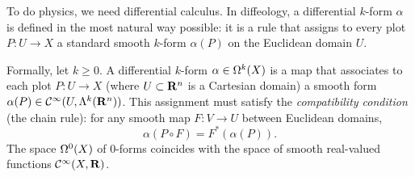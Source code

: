   \begin{article}
    To do physics,
    we need differential calculus.
    In diffeology,
    a differential $k$-form $\alpha$ is defined in the most natural way possible:
    it is a rule that assigns to every plot $P: U \to X$ a standard smooth $k$-form $\alpha(P)$ on the Euclidean domain $U$.
    
    Formally,
    let $k \geq 0$.
    A differential $k$-form $\alpha \in \Omega^k(X)$ is a map that associates to each plot $P: U \to X$ (where $U \subset {\mathbf{R}}^n$ is a Cartesian domain) a smooth form $\alpha(P) \in {\mathcal{C}}^\infty(U, \Lambda^k({\mathbf{R}}^n))$.
    This assignment must satisfy the \emph{compatibility condition} (the chain rule):
    for any smooth map $F: V \to U$ between Euclidean domains,
    \[
      \alpha(P \circ F) = F^*(\alpha(P)).
      \]
    The space $\Omega^0(X)$ of $0$-forms coincides with the space of smooth real-valued functions ${\mathcal{C}}^\infty(X, {\mathbf{R}})$.
    
  \end{article}
